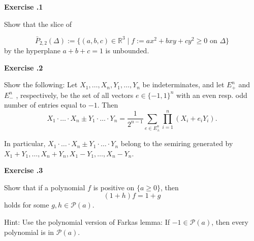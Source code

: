 \documentclass{imo_en}
\newcommand{\R}{\mathbb{R}}
\newcommand{\set}[1]{\{#1\}}
\begin{document}
\maketitle


{\large \textbf{Exercise \thesheetnumber .1}} \bigskip 

Show that the slice of

$$\bar{P}_{2,2}(\Delta) := \set{ (a, b, c) \in \R^3 \mid f := ax^2 + bxy + cy^2 \geq 0 \text{ on } \Delta}$$
by the hyperplane $a + b + c = 1$ is unbounded.

\bigskip


{\large \textbf{Exercise \thesheetnumber .2}} \bigskip

Show the following: Let $X_1,\ldots, X_n, Y_1, \ldots, Y_n$ be indeterminates, and let $E^n_+$ and $E^n_-$ , respectively, be the set of all vectors $e \in \set{-1, 1}^n$ with an even resp. odd number of entries equal to $-1$. Then
$$ X_1 \cdot \ldots \cdot X_n \pm Y_1 \cdot \ldots \cdot Y_n = \frac{1}{2^{n-1}} \sum_{e \in E_\pm^n} \prod_{i=1}^n (X_i + e_i Y_i).$$

In particular, $X_1 \cdot \ldots \cdot X_n \pm Y_1 \cdot \ldots \cdot Y_n$ belong to the semiring generated by $X_1 + Y_1, \ldots, X_n + Y_n, X_1 - Y_1, \ldots, X_n - Y_n$.

\bigskip


{\large \textbf{Exercise \thesheetnumber .3}} \bigskip 

Show that if a polynomial $f$ is positive on $\set{a \geq 0}$, then
$$(1 + h)f = 1 + g$$
holds for some $g, h \in \mathcal{P}(a)$.
\vspace{1\baselineskip}

Hint: Use the polynomial version of Farkas lemma: If $-1 \in \mathcal{P}(a)$, then every polynomial is in $\mathcal{P}(a)$.

%
%
%
%



%
\end{document}
